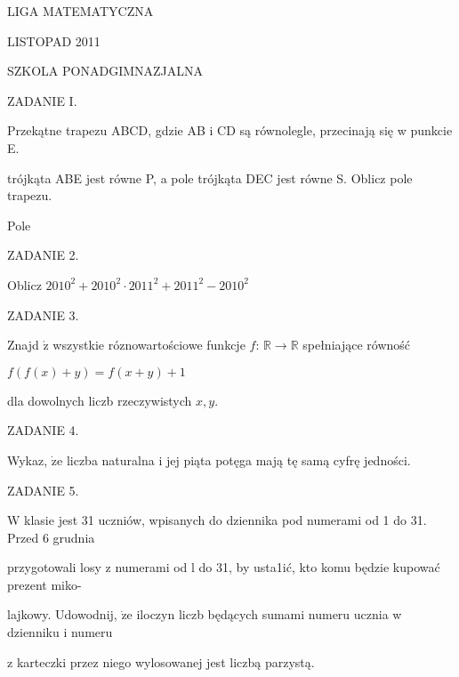 \documentclass[a4paper,12pt]{article}
\begin{document}
LIGA MATEMATYCZNA

LISTOPAD 2011

SZKOLA PONADGIMNAZJALNA

ZADANIE I.

Przekątne trapezu ABCD, gdzie AB i CD są równolegle, przecinają się w punkcie E.

trójkąta ABE jest równe P, a pole trójkąta DEC jest równe S. Oblicz pole trapezu.

Pole

ZADANIE 2.

Oblicz $2010^{2}+2010^{2}\cdot 2011^{2}+2011^{2}-2010^{2}$

ZADANIE 3.

Znajd $\acute{\mathrm{z}}$ wszystkie róznowartościowe funkcje $f$: $\mathbb{R}\rightarrow \mathbb{R}$ spełniające równość

$f(f(x)+y)=f(x+y)+1$

dla dowolnych liczb rzeczywistych $x, y.$

ZADANIE 4.

Wykaz, $\dot{\mathrm{z}}\mathrm{e}$ liczba naturalna i jej piąta potęga mają tę samą cyfrę jedności.

ZADANIE 5.

$\mathrm{W}$ klasie jest 31 uczniów, wpisanych do dziennika pod numerami od 1 do 31. Przed 6 grudnia

przygotowali losy z numerami od l do 31, by usta1ić, kto komu będzie kupować prezent miko-

lajkowy. Udowodnij, $\dot{\mathrm{z}}\mathrm{e}$ iloczyn liczb będących sumami numeru ucznia w dzienniku i numeru

z karteczki przez niego wylosowanej jest liczbą parzystą.
\end{document}
